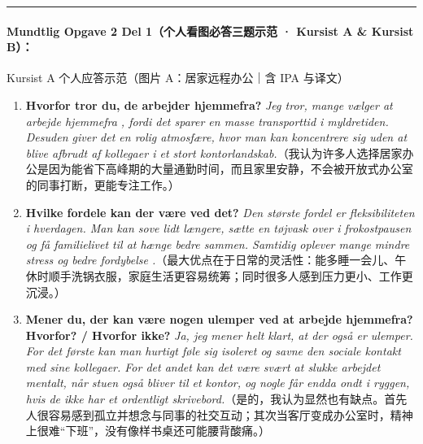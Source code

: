 \vspace{0.35em}
\hrule
\vspace{0.35em}
\paragraph*{Mundtlig Opgave 2 Del 1（个人看图必答三题示范 · Kursist A \& Kursist B）：}

\begin{grammatikbox}{Kursist A 个人应答示范（图片 A：居家远程办公｜含 IPA 与译文）}
\small
\begin{enumerate}
  \item \textbf{Hvorfor tror du, de arbejder hjemmefra?} \textit{Jeg tror, mange vælger at arbejde hjemmefra , fordi det sparer en masse transporttid i myldretiden. Desuden giver det en rolig atmosfære, hvor man kan koncentrere sig uden at blive afbrudt af kollegaer i et stort kontorlandskab.}（我认为许多人选择居家办公是因为能省下高峰期的大量通勤时间，而且家里安静，不会被开放式办公室的同事打断，更能专注工作。）
  \item \textbf{Hvilke fordele kan der være ved det?} \textit{Den største fordel er fleksibiliteten  i hverdagen. Man kan sove lidt længere, sætte en tøjvask over i frokostpausen og få familielivet til at hænge bedre sammen. Samtidig oplever mange mindre stress og bedre fordybelse .}（最大优点在于日常的灵活性：能多睡一会儿、午休时顺手洗锅衣服，家庭生活更容易统筹；同时很多人感到压力更小、工作更沉浸。）
  \item \textbf{Mener du, der kan være nogen ulemper ved at arbejde hjemmefra? Hvorfor? / Hvorfor ikke?} \textit{Ja, jeg mener helt klart, at der også er ulemper. For det første kan man hurtigt føle sig isoleret  og savne den sociale kontakt med sine kollegaer. For det andet kan det være svært at slukke arbejdet mentalt, når stuen også bliver til et kontor, og nogle får endda ondt i ryggen, hvis de ikke har et ordentligt skrivebord.}（是的，我认为显然也有缺点。首先人很容易感到孤立并想念与同事的社交互动；其次当客厅变成办公室时，精神上很难“下班”，没有像样书桌还可能腰背酸痛。）
\end{enumerate}
\end{grammatikbox}

